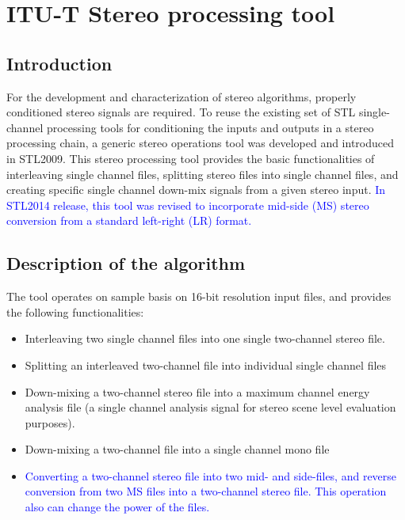 % 
\chapter{ITU-T Stereo processing tool}

\section{Introduction}

For the development and characterization of stereo algorithms,
properly conditioned stereo signals are required. To reuse the
existing set of STL single-channel processing tools for conditioning
the inputs and outputs in a stereo processing chain, a generic stereo
operations tool was developed and introduced in STL2009. This stereo
processing tool provides the basic functionalities of interleaving
single channel files, splitting stereo files into single channel
files, and creating specific single channel down-mix signals from a
given stereo input. \textcolor{blue}{In STL2014 release, this tool was
revised to incorporate mid-side (MS) stereo conversion from a
standard left-right (LR) format.}

\section{Description of the algorithm}

The tool operates on sample basis on 16-bit resolution input files,
and provides the following functionalities:

\begin{itemize}
\item Interleaving two single channel files into one single
  two-channel stereo file.
\item Splitting an interleaved two-channel file into individual single
  channel files 
\item Down-mixing a two-channel stereo file into a maximum channel
  energy analysis file (a single channel analysis signal for stereo
  scene level evaluation purposes).
\item Down-mixing a two-channel file into a single channel mono file
\item \textcolor{blue}{Converting a two-channel stereo file into two
    mid- and side-files, and reverse conversion from two MS files into
    a two-channel stereo file. This operation also can change the power of
    the files.}
\end{itemize}

